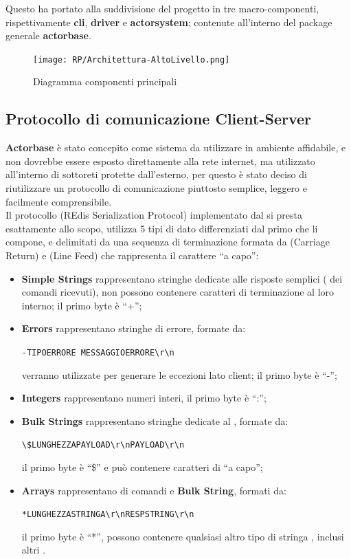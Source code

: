 \documentclass{scalatekids-article}
\begin{document}
Questo ha portato alla suddivisione del progetto in tre macro-componenti, rispettivamente
\textbf{cli}, \textbf{driver} e \textbf{actorsystem}; contenute all'interno del package
generale \textbf{actorbase}.

\begin{figure}[H]
  \begin{center}
    \texttt{[image: RP/Architettura-AltoLivello.png]}
    \caption{Diagramma componenti principali}
  \end{center}
\end{figure}

\subsection{Protocollo di comunicazione Client-Server}
\label{sec:RESP}

\textbf{Actorbase} è stato concepito come sistema da utilizzare in ambiente
affidabile, e non dovrebbe essere esposto direttamente alla rete internet, ma
utilizzato all'interno di sottoreti protette dall'esterno, per questo è stato
deciso di riutilizzare un protocollo di comunicazione
piuttosto semplice, leggero e facilmente comprensibile.\\
Il protocollo  (REdis Serialization Protocol) implementato
dal   si presta esattamente allo scopo, utilizza
5 tipi di dato differenziati dal primo  che li compone, e delimitati
da una sequenza di terminazione formata da  (Carriage Return) e 
(Line Feed) che rappresenta il carattere ``a capo'':
\begin{itemize}
\item \textbf{Simple Strings} rappresentano stringhe dedicate alle risposte
  semplici ( dei comandi ricevuti), non possono contenere caratteri
  di terminazione al loro interno; il primo byte è ``+'';
\item \textbf{Errors} rappresentano stringhe di errore, formate da:
  \begin{center}
    \verb=-TIPOERRORE MESSAGGIOERRORE\r\n=
  \end{center}
  verranno utilizzate per generare le eccezioni lato client; il primo byte è ``-'';
\item \textbf{Integers} rappresentano numeri interi, il primo byte è ``:'';
\item \textbf{Bulk Strings} rappresentano stringhe dedicate al , formate da:
  \begin{center}
    \verb=\$LUNGHEZZAPAYLOAD\r\nPAYLOAD\r\n=
  \end{center}
  il primo byte è ``\$'' e può contenere caratteri di ``a capo'';
\item \textbf{Arrays} rappresentano  di comandi e \textbf{Bulk String}, formati da:
  \begin{center}
    \verb=*LUNGHEZZASTRINGA\r\nRESPSTRING\r\n=
  \end{center}
 il primo byte è ``*'', possono contenere qualsiasi altro tipo di stringa , inclusi altri .
\end{itemize}
\end{document}
